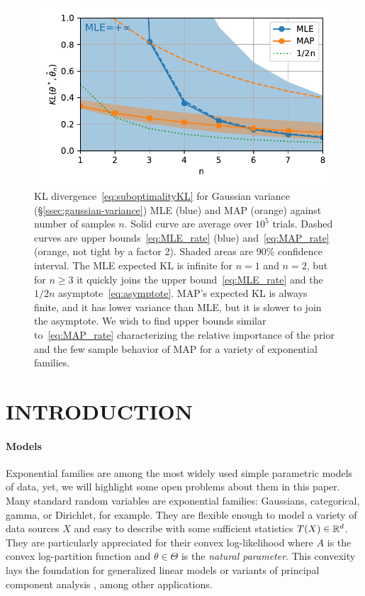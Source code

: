 \documentclass[twoside]{article}
\newcommand{\logpart}{A}
\newcommand{\nat}{\theta}
\newcommand{\lin}[1]{\left\langle#1\right\rangle}
\begin{document}
\begin{figure}[t]
	\centering
\includegraphics[width=.4\textwidth]{gammaMAPrate.pdf}
	\caption{KL divergence~\eqref{eq:suboptimalityKL} for Gaussian variance (\S\ref{ssec:gaussian-variance}) MLE (blue) and MAP (orange) against number of samples $n$. 
		Solid curve  are average over $10^5$ trials.
		Dashed curves are upper bounds~\eqref{eq:MLE_rate} (blue) and~\eqref{eq:MAP_rate} (orange, not tight by a factor 2).
		Shaded areas are 90\% confidence interval.
		The MLE expected KL is infinite for $n=1$ and $n=2$, but for $n\geq3$ it quickly joins the upper bound~\eqref{eq:MLE_rate} and the $1/2n$ asymptote~\eqref{eq:asymptote}.
		MAP's expected KL is always finite, and it has lower variance than MLE, but it is slower to join the asymptote.
		We wish to find upper bounds similar to~\eqref{eq:MAP_rate} characterizing the relative importance of the prior and the few sample behavior of MAP for a variety of exponential families.
	}
	\label{fig:curves}
\end{figure}


\section{INTRODUCTION}
\label{sec:motivation}

\paragraph{Models}
Exponential families are among the most widely used simple parametric models of data, yet, we will highlight some open problems about them in this paper.
Many standard random variables are exponential families: Gaussians, categorical, gamma, or Dirichlet, for example.
They are flexible enough to model a variety of data sources $X$ and easy to describe with some sufficient statistics $T(X) \in \mathbb{R}^d$.
They are particularly appreciated for their convex log-likelihood
\alignn{
f(\nat) := \E[-\log p_\nat(X)] = \logpart(\nat) - \lin{\E[T(X)] , \nat},
\label{eq:defNLL}
}
where $\logpart$ is the convex log-partition function and \mbox{$\nat\in\Theta$} is the \textit{natural parameter}.
This convexity lays the foundation for generalized linear models \citep{mccullagh1989generalized} or variants of principal component analysis \citep{collins2001generalization}, among other applications.
\end{document}
